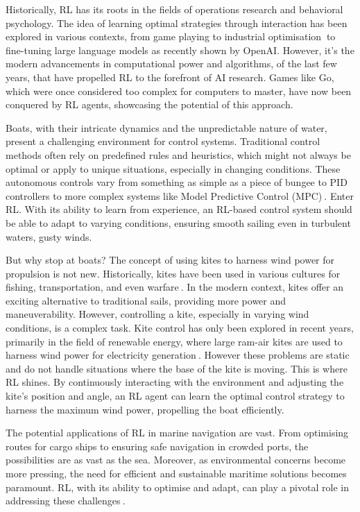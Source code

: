 Historically, RL has its roots in the fields of operations research and behavioral psychology. The idea of learning optimal strategies through interaction has been explored in various contexts, from game playing to industrial optimisation$~$\cite{bellman1957dynamic} to fine-tuning large language models as recently shown by OpenAI. However, it's the modern advancements in computational power and algorithms, of the last few years, that have propelled RL to the forefront of AI research. Games like Go, which were once considered too complex for computers to master, have now been conquered by RL agents, showcasing the potential of this approach\cite{silver2016mastering}.

Boats, with their intricate dynamics and the unpredictable nature of water, present a challenging environment for control systems. Traditional control methods often rely on predefined rules and heuristics, which might not always be optimal or apply to unique situations, especially in changing conditions. These autonomous controls vary from something as simple as a piece of bungee to PID controllers to more complex systems like Model Predictive Control (MPC)$~$\cite{erhard2013control}. Enter RL. With its ability to learn from experience, an RL-based control system should be able to adapt to varying conditions, ensuring smooth sailing even in turbulent waters, gusty winds.

But why stop at boats? The concept of using kites to harness wind power for propulsion is not new. Historically, kites have been used in various cultures for fishing, transportation, and even warfare$~$\cite{hallion2003taking}. In the modern context, kites offer an exciting alternative to traditional sails, providing more power and maneuverability. However, controlling a kite, especially in varying wind conditions, is a complex task.  Kite control has only been explored in recent years, primarily in the field of renewable energy, where large ram-air kites are used to harness wind power for electricity generation$~$\cite{kitecontrol}. However these problems are static and do not handle situations where the base of the kite is moving. This is where RL shines. By continuously interacting with the environment and adjusting the kite's position and angle, an RL agent can learn the optimal control strategy to harness the maximum wind power, propelling the boat efficiently.

The potential applications of RL in marine navigation are vast. From optimising routes for cargo ships to ensuring safe navigation in crowded ports, the possibilities are as vast as the sea. Moreover, as environmental concerns become more pressing, the need for efficient and sustainable maritime solutions becomes paramount. RL, with its ability to optimise and adapt, can play a pivotal role in addressing these challenges$~$\cite{christiansen2013ship}.

